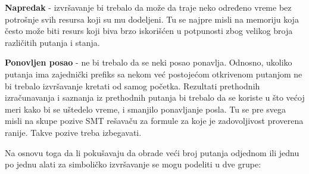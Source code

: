 \documentclass[12pt,oneside]{memoir}
\begin{document}
\begin{description}
    \item \textbf{Napredak} - izvršavanje bi trebalo da može da traje neko određeno vreme bez potrošnje svih resursa koji su mu dodeljeni. Tu se najpre misli na memoriju koja često može biti resurs koji biva brzo iskorišćen u potpunosti zbog velikog broja različitih putanja i stanja.
    
    \item \textbf{Ponovljen posao} - ne bi trebalo da se neki posao ponavlja. Odnosno, ukoliko putanja ima zajednički prefiks sa nekom već postojećom otkrivenom putanjom ne bi trebalo izvršavanje kretati od samog početka. Rezultati prethodnih izračunavanja i saznanja iz prethodnih putanja bi trebalo da se koriste u što većoj meri kako bi se uštedelo vreme, i smanjilo ponavljanje posla. Tu se pre svega misli na skupe pozive SMT rešavaču za formule za koje je zadovoljivost proverena ranije. Takve pozive treba izbegavati.
    
\end{description}
\bigskip
Na osnovu toga da li pokušavaju da obrade veći broj putanja odjednom ili jednu po jednu alati za simboličko izvršavanje se mogu podeliti u dve grupe:
\end{document}
